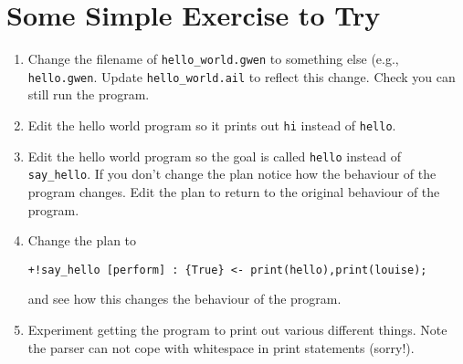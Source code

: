\section{Some Simple Exercise to Try}
\begin{enumerate}
\item Change the filename of \texttt{hello\_world.gwen} to something else (e.g., \texttt{hello.gwen}.  Update \texttt{hello\_world.ail} to reflect this change.  Check you can still run the program.
\item Edit the hello world program so it prints out \texttt{hi} instead of \texttt{hello}.
\item Edit the hello world program so the goal is called \texttt{hello} instead of \texttt{say\_hello}.  If you don't change the plan notice how the behaviour of the program changes.  Edit the plan to return to the original behaviour of the program.
\item Change the plan to
\begin{verbatim}
+!say_hello [perform] : {True} <- print(hello),print(louise);
\end{verbatim} and see how this changes the behaviour of the program.
\item Experiment getting the program to print out various different things.  Note the parser can not cope with whitespace in print statements (sorry!).
\end{enumerate}

